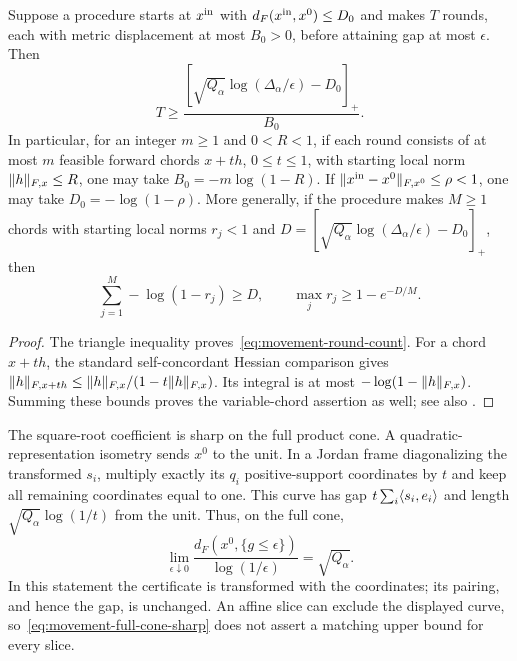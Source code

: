 \begin{corollary}\label{cor:movement-rounds}
Suppose a procedure starts at $x^{\rm in}$ with
$d_F(x^{\rm in},x^0)\leq D_0$ and makes $T$ rounds, each with metric
displacement at most $B_0>0$, before attaining gap at most $\epsilon$.
Then
\begin{equation}\label{eq:movement-round-count}
 T\geq
 \frac{[\sqrt{Q_\alpha}\log(\Delta_\alpha/\epsilon)-D_0]_+}{B_0}.
\end{equation}
In particular, for an integer $m\geq1$ and $0<R<1$, if each round
consists of at most $m$ feasible forward chords $x+th$,
$0\leq t\leq1$, with starting local norm $\lVert h\rVert_{F,x}\leq R$, one may
take $B_0=-m\log(1-R)$. If $\lVert x^{\rm in}-x^0\rVert_{F,x^0}\leq\rho<1$,
one may take $D_0=-\log(1-\rho)$. More generally, if the procedure
makes $M\geq1$ chords with starting local norms $r_j<1$ and
$D=[\sqrt{Q_\alpha}\log(\Delta_\alpha/\epsilon)-D_0]_+$, then
\begin{equation}\label{eq:movement-variable-chords}
 \sum_{j=1}^M-\log(1-r_j)\geq D,\qquad
 \max_j r_j\geq1-e^{-D/M}.
\end{equation}
\end{corollary}
\begin{proof}
The triangle inequality proves~\eqref{eq:movement-round-count}.
For a chord $x+th$, the standard self-concordant Hessian comparison gives
$\lVert h\rVert_{F,x+th}\leq\lVert h\rVert_{F,x}/(1-t\lVert h\rVert_{F,x})$.
Its integral is at most $-\log(1-\lVert h\rVert_{F,x})$. Summing these
bounds proves the variable-chord assertion as well; see also
\cite[Lemma~3.2 and Corollary~3.2]{NT2002}.
\end{proof}

The square-root coefficient is sharp on the full product cone. A
quadratic-representation isometry sends $x^0$ to the unit. In a Jordan
frame diagonalizing the transformed $s_i$, multiply exactly its $q_i$
positive-support coordinates by $t$ and keep all remaining coordinates
equal to one. This curve has gap $t\sum_i\langle s_i,e_i\rangle$ and length
$\sqrt{Q_\alpha}\log(1/t)$ from the unit. Thus, on the full cone,
\begin{equation}\label{eq:movement-full-cone-sharp}
 \lim_{\epsilon\downarrow0}
 \frac{d_F(x^0,\{g\leq\epsilon\})}{\log(1/\epsilon)}
 =\sqrt{Q_\alpha}.
\end{equation}
In this statement the certificate is transformed with the coordinates;
its pairing, and hence the gap, is unchanged. An affine slice can exclude
the displayed curve, so~\eqref{eq:movement-full-cone-sharp} does not
assert a matching upper bound for every slice.

